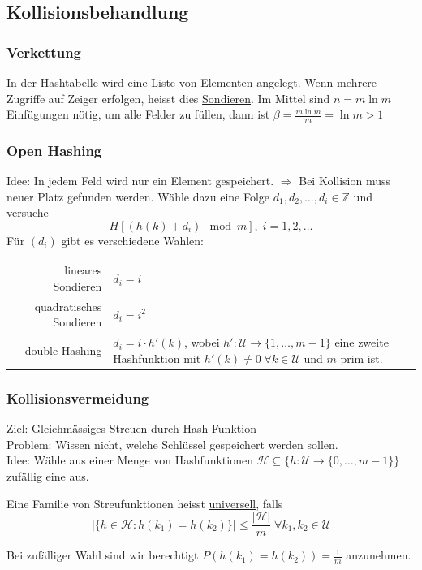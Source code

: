 \documentclass{scrartcl}
\begin{document}
\subsection{Kollisionsbehandlung}
\subsubsection{Verkettung}
In der Hashtabelle wird eine Liste von Elementen angelegt. Wenn mehrere Zugriffe auf Zeiger erfolgen, heisst dies \underline{Sondieren}. Im Mittel sind $n=m\ln m$ Einfügungen nötig, um alle Felder zu füllen, dann ist $\beta=\frac{m\ln m}{m}=\ln m > 1$
\subsubsection{Open Hashing}
Idee: In jedem Feld wird nur ein Element gespeichert. $\Rightarrow$ Bei Kollision muss neuer Platz gefunden werden. Wähle dazu eine Folge $d_1,d_2,\ldots,d_i \in \mathds{Z}$ und versuche \[ H[(h(k)+d_i) \mod m], \; i=1,2,\ldots \]
Für $(d_i)$ gibt es verschiedene Wahlen: \\
\begin{tabular}{rp{13cm}}
lineares Sondieren & $d_i=i$ \\
quadratisches Sondieren & $d_i=i^2$ \\
double Hashing & $d_i=i\cdot h'(k)$, wobei $h':\mathcal{U}\to \{1,\ldots,m-1\}$ eine zweite Hashfunktion mit $h'(k) \not= 0 \; \forall k\in\mathcal{U}$ und $m$ prim ist. \\
\end{tabular}

\subsubsection{Kollisionsvermeidung}
Ziel: Gleichmässiges Streuen durch Hash-Funktion\\
Problem: Wissen nicht, welche Schlüssel gespeichert werden sollen. \\
Idee: Wähle aus einer Menge von Hashfunktionen $\mathcal{H} \subseteq \{h:\mathcal{U} \to \{0,\ldots,m-1\}\}$ zufällig eine aus.
\begin{shaded}
Eine Familie von Streufunktionen heisst \underline{universell}, falls \[ \vert \{h\in\mathcal{H}: h(k_1) = h(k_2)\}\vert \leq \frac{\vert \mathcal{H}\vert}{m}\;\forall k_1,k_2\in\mathcal{U} \]
\end{shaded}
Bei zufälliger Wahl sind wir berechtigt $P(h(k_1)=h(k_2))=\frac{1}{m}$ anzunehmen. \\
\end{document}
